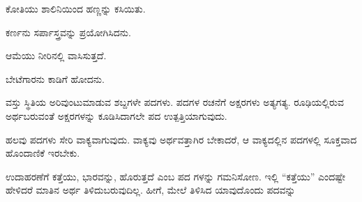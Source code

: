 \vspace{2.5pt plus 3pt minus 0.5pt}\noindent\hspace*{1.2em}\hspace{0.55em}ಕೋತಿಯು ಶಾಲಿನಿಯಿಂದ ಹಣ್ಣನ್ನು ಕಸಿಯಿತು.\par

\vspace{2.5pt plus 3pt minus 0.5pt}\noindent\hspace*{1.2em}\hspace{0.55em}ಕರ್ಣನು ಸರ್ಪಾಸ್ತ್ರವನ್ನು ಪ್ರಯೋಗಿಸಿದನು.\par

\vspace{2.5pt plus 3pt minus 0.5pt}\noindent\hspace*{1.2em}\hspace{0.55em}ಆಮೆಯು ನೀರಿನಲ್ಲಿ ವಾಸಿಸುತ್ತದೆ.\par

\vspace{2.5pt plus 3pt minus 0.5pt}\noindent\hspace*{1.2em}\hspace{0.55em}ಬೇಟೆಗಾರನು ಕಾಡಿಗೆ ಹೋದನು.\par


\indent ವಸ್ತು ಸ್ಥಿತಿಯ ಅರಿವುಂಟುಮಾಡುವ ಶಬ್ದಗಳೇ ಪದಗಳು. ಪದಗಳ ರಚನೆಗೆ ಅಕ್ಷರಗಳು ಅತ್ಯಗತ್ಯ. ರೂಢಿಯಲ್ಲಿರುವ ಅರ್ಥಬರುವಂತೆ ಅಕ್ಷರಗಳನ್ನು ಕೂಡಿಸಿದಾಗಲೇ ಪದ ಉತ್ಪತ್ತಿಯಾಗುವುದು.\par

\indent ಹಲವು ಪದಗಳು ಸೇರಿ ವಾಕ್ಯವಾಗುವುದು. ವಾಕ್ಯವು ಅರ್ಥವತ್ತಾಗಿರ ಬೇಕಾದರೆ, ಆ ವಾಕ್ಯದಲ್ಲಿನ ಪದಗಳಲ್ಲಿ ಸೂಕ್ತವಾದ ಹೊಂದಾಣಿಕೆ ಇರಬೇಕು.\par

\indent ಉದಾಹರಣೆಗೆ ಕತ್ತೆಯು, ಭಾರವನ್ನು, ಹೊರುತ್ತದೆ ಎಂಬ ಪದ ಗಳನ್ನು ಗಮನಿಸೋಣ. ಇಲ್ಲಿ “ಕತ್ತೆಯು” ಎಂದಷ್ಟೇ ಹೇಳಿದರೆ ಮಾತಿನ ಅರ್ಥ ತಿಳಿದುಬರುವುದಿಲ್ಲ. ಹೀಗೆ, ಮೇಲೆ ತಿಳಿಸಿದ ಯಾವುದೊಂದು ಪದವನ್ನು\kbvcontinues
